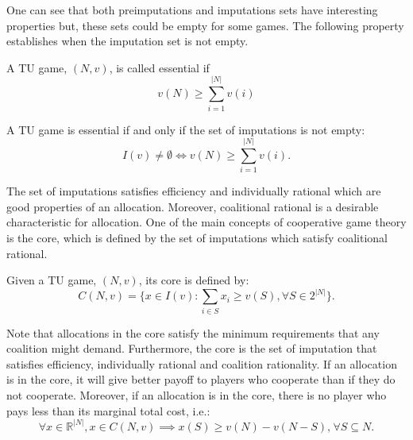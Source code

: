 One can see that both preimputations and imputations sets have interesting properties but, these sets could be empty for some games. The following property establishes when the imputation set is not empty.

\begin{definition}
	A TU game, $(N,v)$, is called essential if
	$$v(N) \geq \sum_{i=1}^{|N|} v(i)$$
\end{definition}
\begin{proposition}
	A TU game is essential if and only if the set of imputations is not empty:
	$$I(v) \ne \emptyset \iff v(N) \geq \sum_{i=1}^{|N|} v(i).$$
\end{proposition}



The set of imputations satisfies efficiency and individually rational which are good properties of an allocation. Moreover, coalitional rational is a desirable characteristic for allocation. One of the main concepts of cooperative game theory is the core, which is defined by the set of imputations which satisfy coalitional rational. 

\begin{definition}
	Given a TU game, $(N,v)$, its core is defined by: 
	$$C(N,v) = \{ x \in I(v) : \sum_{i \in S}x_{i}  \geq v(S), \forall S \in 2^{|N|}  \}.$$
\end{definition}
Note that allocations in the core satisfy the minimum requirements that any coalition might demand. Furthermore, the core is the set of imputation that satisfies efficiency, individually rational and coalition rationality. If an allocation is in the core, it will give better payoff to players who cooperate than if they do not cooperate. Moreover, if an allocation is in the core, there is no player who pays less than its marginal total cost, i.e.:
$$ \forall x\in \mathbb{R}^{|N|}, x \in C(N,v) \implies x(S) \geq v(N) - v(N-S) , \hspace{1pt}\forall S \subseteq N .$$

